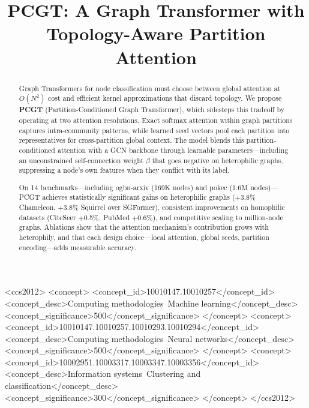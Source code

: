 \documentclass[manuscript, screen, review, anonymous]{acmart}
\begin{document}
\title{PCGT: A Graph Transformer with Topology-Aware Partition Attention}


\begin{abstract}
Graph Transformers for node classification must choose between global attention at $O(N^2)$ cost and efficient kernel approximations that discard topology. We propose \textbf{PCGT} (Partition-Conditioned Graph Transformer), which sidesteps this tradeoff by operating at two attention resolutions. Exact softmax attention within graph partitions captures intra-community patterns, while learned seed vectors pool each partition into representatives for cross-partition global context. The model blends this partition-conditioned attention with a GCN backbone through learnable parameters---including an unconstrained self-connection weight $\beta$ that goes negative on heterophilic graphs, suppressing a node's own features when they conflict with its label.

On 14 benchmarks---including ogbn-arxiv (169K nodes) and pokec (1.6M nodes)---PCGT achieves statistically significant gains on heterophilic graphs ($+$3.8\% Chameleon, $+$3.8\% Squirrel over SGFormer), consistent improvements on homophilic datasets (CiteSeer $+$0.5\%, PubMed $+$0.6\%), and competitive scaling to million-node graphs. Ablations show that the attention mechanism's contribution grows with heterophily, and that each design choice---local attention, global seeds, partition encoding---adds measurable accuracy.
\end{abstract}

\begin{CCSXML}
<ccs2012>
   <concept>
       <concept_id>10010147.10010257</concept_id>
       <concept_desc>Computing methodologies~Machine learning</concept_desc>
       <concept_significance>500</concept_significance>
   </concept>
   <concept>
       <concept_id>10010147.10010257.10010293.10010294</concept_id>
       <concept_desc>Computing methodologies~Neural networks</concept_desc>
       <concept_significance>500</concept_significance>
   </concept>
   <concept>
       <concept_id>10002951.10003317.10003347.10003356</concept_id>
       <concept_desc>Information systems~Clustering and classification</concept_desc>
       <concept_significance>300</concept_significance>
   </concept>
</ccs2012>
\end{CCSXML}
\end{document}

